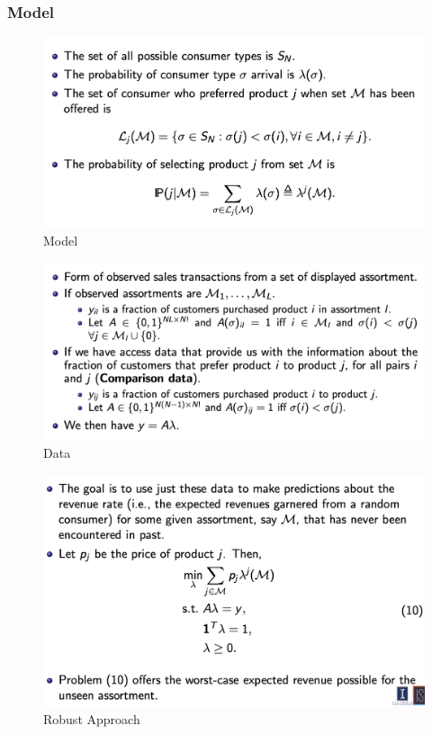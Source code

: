 \documentclass[11pt]{elegantbook}
\begin{document}
\subsubsection{ Model}
\begin{center}\begin{figure}[htbp]
    \centering
    \includegraphics[scale=0.5]{RLCM2.png}
    \caption{Model}
    \label{}
\end{figure}\end{center}
\begin{center}\begin{figure}[htbp]
    \centering
    \includegraphics[scale=0.5]{RLCM3.png}
    \caption{Data}
    \label{}
\end{figure}\end{center}
\begin{center}\begin{figure}[htbp]
    \centering
    \includegraphics[scale=0.5]{RLCM4.png}
    \caption{Robust Approach}
    \label{}
\end{figure}\end{center}
\end{document}
